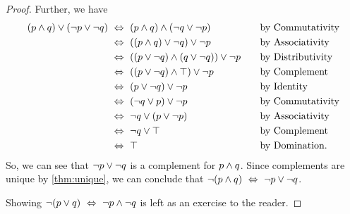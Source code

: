 \begin{proof}
    Further, we have
    \begin{alignat*}{2}
        (p \meet q) \join (\neg p \join \neg q) &\iff (p \meet q) \meet (\neg q \join \neg p)~~~~~~~~~~~~&&\text{by Commutativity}\\
                                                &\iff \pn*{(p \meet q) \join \neg q} \join \neg p &&\text{by Associativity}\\
                                                &\iff \pn*{(p \join \neg q) \meet (q \join \neg q)} \join \neg p &&\text{by Distributivity}\\
                                                &\iff \pn*{(p \join \neg q) \meet \top} \join \neg p &&\text{by Complement}\\
                                                &\iff (p \join \neg q) \join \neg p &&\text{by Identity}\\
                                                &\iff (\neg q \join p) \join \neg p &&\text{by Commutativity}\\
                                                &\iff \neg q \join (p \join \neg p) &&\text{by Associativity}\\
                                                &\iff \neg q \join \top &&\text{by Complement}\\
                                                &\iff \top &&\text{by Domination}.
    \end{alignat*}
    So, we can see that $\neg p \vee \neg q$ is a complement for $p \wedge q$.
    Since complements are unique by \autoref{thm:unique},
    we can conclude that $\neg (p \wedge q) ~\Leftrightarrow~ \neg p \vee \neg q$.

    Showing $\neg (p \vee q) ~\Leftrightarrow~ \neg p \wedge \neg q$ is left as an exercise to the reader.
\end{proof}

